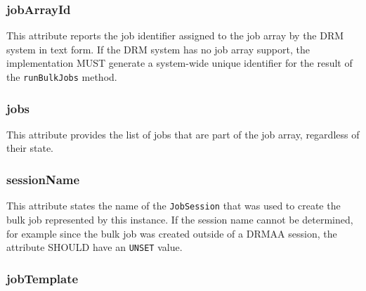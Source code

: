 \documentclass{article}
\newcommand{\h}[1]{\lstinline|#1|}
\newcommand{\rat}[1]{}
\begin{document}
\subsubsection{jobArrayId}

This attribute reports the job identifier assigned to the job array by the DRM system in text form. If the DRM system has no job array support, the implementation MUST generate a system-wide unique identifier for the result of the \h{runBulkJobs} method.

\subsubsection{jobs}

This attribute provides the list of jobs that are part of the job array, regardless of their state.

\rat{
We were asked for offering a filter support similar to JobSession here. This was rejected by discussion on the list (Jan 2011), since the number of jobs returned here is normally comparatively short. In this case, the DRM system cannot provide any benefit over the looped check in the application itself.

The disappearance of terminated jobs is intentionally not specified (see discussion above for \h{getJobs}).
}

\subsubsection{sessionName}

This attribute states the name of the \h{JobSession} that was used to create the bulk job represented by this instance. If the session name cannot be determined, for example since the bulk job was created outside of a DRMAA session, the attribute SHOULD have an \h{UNSET} value.

\rat{June 29th 2011 conf call decided to return session names instead of session objects. This keeps the consistent approach that instantiated session objects represent a live ``connection'' to the DRMS. Connecting to the referenced session is then a separate explicit step in the application. It also supports better that people create instances from bulk jobs created outside of a DRMAA session.
}

\subsubsection{jobTemplate}
\end{document}

